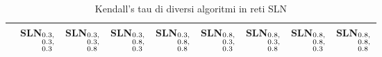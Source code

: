 \begin{table}[!htbp]
    \caption{Kendall's tau di diversi algoritmi in reti SLN}
    \label{tab:tausln}
    \centering
    \begin{tabular}{lrrrrrrrr}
        \toprule
          & SLN$_{\begin{subarray}{l} 0.3\text{,} \\ 0.3\text{,} \\ 0.3 \end{subarray}}$ 
          & SLN$_{\begin{subarray}{l} 0.3\text{,} \\ 0.3\text{,} \\ 0.8 \end{subarray}}$ 
          & SLN$_{\begin{subarray}{l} 0.3\text{,} \\ 0.8\text{,} \\ 0.3 \end{subarray}}$ 
          & SLN$_{\begin{subarray}{l} 0.3\text{,} \\ 0.8\text{,} \\ 0.8 \end{subarray}}$ 
          & SLN$_{\begin{subarray}{l} 0.8\text{,} \\ 0.3\text{,} \\ 0.3 \end{subarray}}$ 
          & SLN$_{\begin{subarray}{l} 0.8\text{,} \\ 0.3\text{,} \\ 0.8 \end{subarray}}$ 
          & SLN$_{\begin{subarray}{l} 0.8\text{,} \\ 0.8\text{,} \\ 0.3 \end{subarray}}$ 
          & SLN$_{\begin{subarray}{l} 0.8\text{,} \\ 0.8\text{,} \\ 0.8 \end{subarray}}$ \\
        \midrule

\end{tabular}
\end{table}
